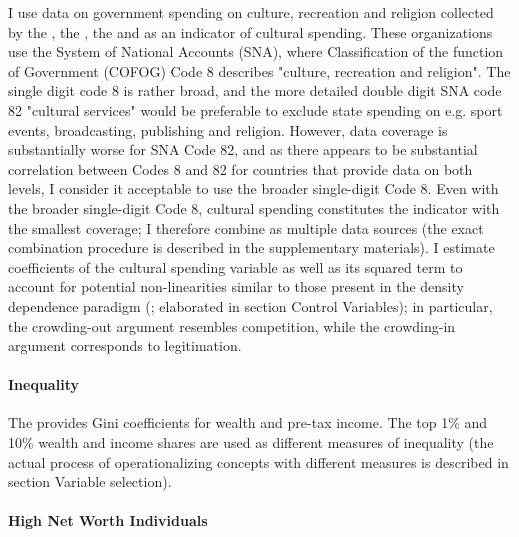 \documentclass[11pt, authoryear]{elsarticle}
\begin{document}
I use data on government spending on culture, recreation and religion collected by the \citet{UN_2022_consumption}, the \citet{IMF_2022_GFS}, the \citet{OECD_2022_SNA_TABLE11_ARCHIVE,OECD_2022_SNA_TABLE11} and \citet{Eurostat_2022_COFOG} as an indicator of cultural spending.
These organizations use the System of National Accounts (SNA), where Classification of the function of Government (COFOG) Code 8 describes "culture, recreation and religion".
The single digit code 8 is rather broad, and the more detailed  double digit SNA code 82 "cultural services" would be preferable to exclude state spending on e.g. sport events, broadcasting, publishing and religion. 
However, data coverage is substantially worse for SNA Code 82, and as there appears to be substantial correlation between Codes 8 and 82 for countries that provide data on both levels, I consider it acceptable to use the broader single-digit Code 8.
Even with the broader single-digit Code 8, cultural spending constitutes the indicator with the smallest coverage; I therefore combine as multiple data sources (the exact combination procedure is described in the supplementary materials).
I estimate coefficients of the cultural spending variable as well as its squared term to account for potential non-linearities similar to those present in the density dependence paradigm (\citealt{Hannan_1992_dynamics};  elaborated in section Control Variables); in particular, the crowding-out argument resembles competition, while the crowding-in argument corresponds to legitimation.


\paragraph*{Inequality}

The \citet{WID_2021_WID} provides Gini coefficients for wealth and pre-tax income.
The top 1\% and 10\% wealth and income shares are used as different measures of inequality (the actual process of operationalizing concepts with different measures is described in section Variable selection).


\paragraph*{High Net Worth Individuals}
\end{document}
